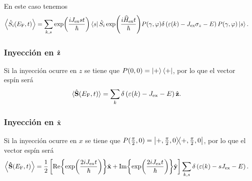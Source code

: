 En este caso tenemos
\begin{equation}\label{eq:S_EV:magZpre}
	\expval{\hat{S}_i(E_{\rm{F}},t)} = \sum_{k, s} \exp(\frac{i J_{\rm ex }s t}{\hbar}) \bra{ s}\hat{S}_i \exp(\frac{i\widehat{H}_{\rm ex}t}{\hbar})P(\gamma,\varphi) \delta\left (\varepsilon(k) -J_{\rm ex} \sigma_z  -E\right)P(\gamma,\varphi)\ket{s}.
\end{equation}

\subsubsection{Inyección en $ \hat{\vb z} $}
Si la inyección ocurre en $z$ se tiene que $P(0,0)=\ket{+}\bra{+}$, por lo que el vector espín será 
\begin{equation}
	\langle \hat{\vb{S} }(E_{\rm{F}},t) \rangle = \sum_k\delta\left (\varepsilon(k) -J_{\rm ex} -E\right) \hat{\vb z}.
\end{equation}

\subsubsection{Inyección en $ \hat{\vb x} $}
Si la inyección ocurre en $x$ se tiene que $P(\frac{\pi}{2},0) = \ketbra{+, \frac{\pi}{2}, 0}$, por lo que el vector espín será
\begin{equation}
	\expval{\vector{\hat{S}}(E_{\rm{F}},t)} = \frac{1}{2} \left[ \Re{\exp(\frac{2i J_{\rm ex } t}{\hbar})} \hat{\vector x} + \Im{\exp(\frac{2i J_{\rm ex } t}{\hbar})} \hat{\vector y} \right]  \smashoperator{\sum_{k, s}} \delta\left(\varepsilon(k) - sJ_{\rm ex} -E \right).
\end{equation}